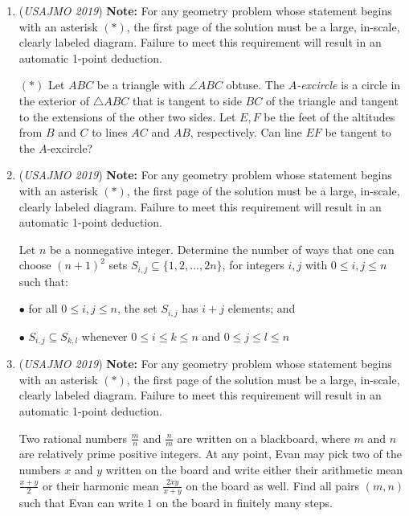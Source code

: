 \begin{enumerate}
 



 

	\item (\textit{USAJMO 2019}) \textbf{Note:} For any geometry problem whose statement begins with an asterisk $(*)$, the first page of the solution must be a large, in-scale, clearly labeled diagram. Failure to meet this requirement will result in an automatic 1-point deduction.


 $(*)$ Let $ABC$ be a triangle with $\angle ABC$ obtuse. The $A$\textit{-excircle} is a circle in the exterior of $\triangle ABC$ that is tangent to side $BC$ of the triangle and tangent to the extensions of the other two sides. Let $E, F$ be the feet of the altitudes from $B$ and $C$ to lines $AC$ and $AB$, respectively. Can line $EF$ be tangent to the $A$-excircle?


 

	\item (\textit{USAJMO 2019}) \textbf{Note:} For any geometry problem whose statement begins with an asterisk $(*)$, the first page of the solution must be a large, in-scale, clearly labeled diagram. Failure to meet this requirement will result in an automatic 1-point deduction.


 Let $n$ be a nonnegative integer. Determine the number of ways that one can choose $(n+1)^2$ sets $S_{i,j} \subseteq \{1,2,...,2n\}$, for integers $i,j$ with $0 \le i,j \le n$ such that:


 $\bullet$ for all $0 \le i,j \le n$, the set $S_{i,j}$ has $i+j$ elements; and


 $\bullet$ $S_{i,j} \subseteq S_{k,l}$ whenever $0 \le i \le k \le n$ and $0 \le j \le l \le n$


	\item (\textit{USAJMO 2019}) \textbf{Note:} For any geometry problem whose statement begins with an asterisk $(*)$, the first page of the solution must be a large, in-scale, clearly labeled diagram. Failure to meet this requirement will result in an automatic 1-point deduction.


 Two rational numbers $\frac{m}{n}$ and $\frac{n}{m}$ are written on a blackboard, where $m$ and $n$ are relatively prime positive integers. At any point, Evan may pick two of the numbers $x$ and $y$ written on the board and write either their arithmetic mean $\frac{x+y}{2}$ or their harmonic mean $\frac{2xy}{x+y}$ on the board as well. Find all pairs $(m,n)$ such that Evan can write $1$ on the board in finitely many steps.


 

\end{enumerate}